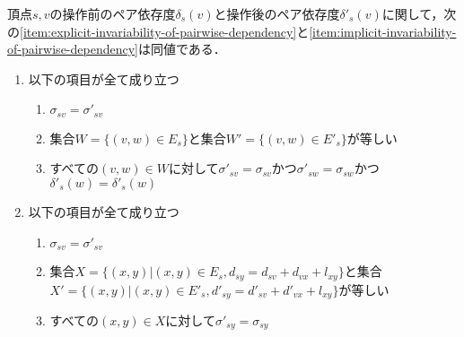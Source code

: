 \begin{lemma}
  \label{lemma:transformation-of-invariability-of-pairwise-dependency}
  頂点$s,v$の操作前のペア依存度$\delta_s(v)$と操作後のペア依存度$\delta'_s(v)$に関して，次の\ref{item:explicit-invariability-of-pairwise-dependency}と\ref{item:implicit-invariability-of-pairwise-dependency}は同値である．
  \begin{enumerate}[label=(\alph*)]
  \item 以下の項目が全て成り立つ
    \label{item:explicit-invariability-of-pairwise-dependency}
    \begin{enumerate}[label=\arabic*.]
    \item $\sigma_{sv}=\sigma'_{sv}$
    \item 集合$W=\{(v,w)\in E_s\}$と集合$W'=\{(v,w)\in E'_s\}$が等しい
    \item すべての$(v,w)\in W$に対して$\sigma'_{sv}=\sigma_{sv}$かつ$\sigma'_{sw}=\sigma_{sw}$かつ$\delta'_s(w)=\delta'_s(w)$
    \end{enumerate}
  \item 以下の項目が全て成り立つ
    \label{item:implicit-invariability-of-pairwise-dependency}
    \begin{enumerate}[label=\arabic*.]
    \item $\sigma_{sv}=\sigma'_{sv}$
    \item 集合$X=\{(x,y)|(x,y)\in E_s,d_{sy}=d_{sv}+d_{vx}+l_{xy}\}$と集合$X'=\{(x,y)|(x,y)\in E'_s,d'_{sy}=d'_{sv}+d'_{vx}+l_{xy}\}$が等しい
    \item すべての$(x,y)\in X$に対して$\sigma'_{sy}=\sigma_{sy}$
    \end{enumerate}
  \end{enumerate}
\end{lemma}
